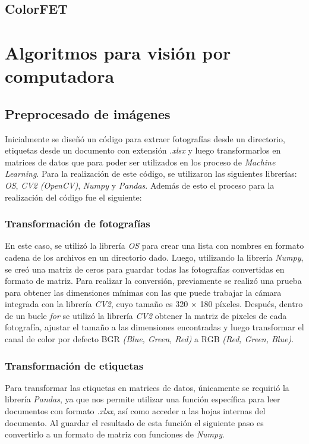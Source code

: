 \section{ColorFET}
\chapter{Algoritmos para visión por computadora}
\section{Preprocesado de imágenes}


Inicialmente se diseñó un código para extraer fotografías desde un directorio, etiquetas desde un documento con extensión \textit{.xlsx} y luego transformarlos en matrices de datos que para poder ser utilizados en los proceso de \textit{Machine Learning}. Para la realización de este código, se utilizaron las siguientes librerías: \textit{OS}, \textit{CV2 (OpenCV)}, \textit{Numpy} y \textit{Pandas}. Además de esto el proceso para la realización del código fue el siguiente: 

\subsection{Transformación de fotografías}
En este caso, se utilizó la librería \textit{OS} para crear una lista con nombres en formato cadena de los archivos en un directorio dado. Luego, utilizando la librería \textit{Numpy}, se creó una matriz de ceros para guardar todas las fotografías convertidas en formato de matriz. Para realizar la conversión, previamente se realizó una prueba para obtener las dimensiones mínimas con las que puede trabajar la cámara integrada con la librería \textit{CV2}, cuyo tamaño es 320 $\times$ 180 píxeles. Después, dentro de un bucle \textit{for} se utilizó la librería \textit{CV2} obtener la matriz de pixeles de cada fotografía, ajustar el tamaño a las dimensiones encontradas y luego transformar el canal de color por defecto BGR \textit{(Blue, Green, Red)} a RGB \textit{(Red, Green, Blue)}. 

\subsection{Transformación de etiquetas}

Para transformar las etiquetas en matrices de datos, únicamente se requirió la librería \textit{Pandas}, ya que nos permite utilizar una función específica para leer documentos con formato \textit{.xlsx}, así como acceder a las hojas internas del documento. Al guardar el resultado de esta función el siguiente paso es convertirlo a un formato de matriz con funciones de \textit{Numpy}. 


